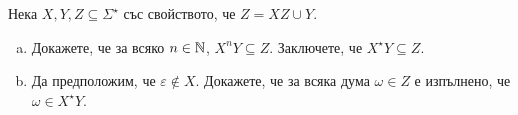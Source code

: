\begin{problem}
  Нека $X, Y, Z \subseteq \Sigma^\star$ със свойството, че $Z = XZ \cup Y$.
  \begin{enumerate}[a)]
  \item 
    Докажете, че за всяко $n \in \mathbb{N}$, $X^nY \subseteq Z$.
    Заключете, че $X^\star Y \subseteq Z$.
  \item
    Да предположим, че $\varepsilon \not\in X$.
    Докажете, че за всяка дума $\omega \in Z$ е изпълнено, че $\omega \in X^\star Y$.
  \end{enumerate}
\end{problem}


